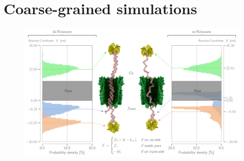 \section{Coarse-grained simulations}

\begin{figure}[h]
  \centering
  \includegraphics[width=0.8\linewidth]{Figures/RotaxaneFluctuations.png}
\end{figure}
